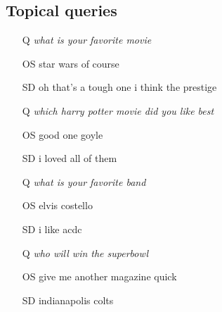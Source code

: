 \documentclass[11pt,a4paper]{article}
\begin{document}
\subsection{Topical queries}
\begin{itemize}
\itemsep0em
\item[Q] \emph{what is your favorite movie}
\item[OS] star wars of course
\item[SD] oh that's a tough one i think the prestige
\end{itemize}
\begin{itemize}
\itemsep0em
\item[Q] \emph{which harry potter movie did you like best}
\item[OS] good one goyle
\item[SD] i loved all of them
\end{itemize}
\begin{itemize}
\itemsep0em
\item[Q] \emph{what is your favorite band}
\item[OS] elvis costello
\item[SD] i like acdc
\end{itemize}
\begin{itemize}
\itemsep0em
\item[Q] \emph{who will win the superbowl}
\item[OS] give me another magazine quick
\item[SD] indianapolis colts
\end{itemize}
\end{document}
